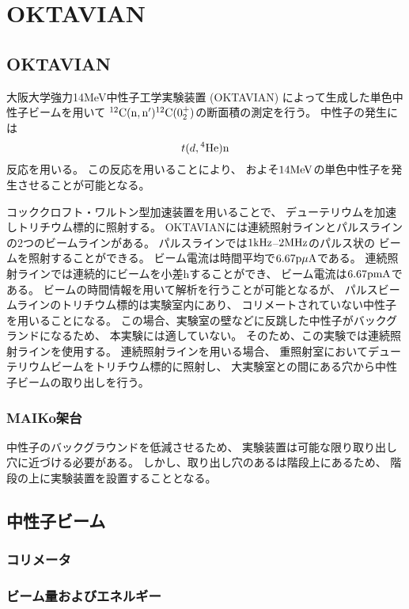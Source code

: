 \chapter{OKTAVIAN}
\section{OKTAVIAN}
大阪大学強力14MeV中性子工学実験装置 (OKTAVIAN) によって生成した単色中性子ビームを用いて
${}^{12}\rm{C}(n,n'){}^{12}\rm{C}(0_{2}^{+})$の断面積の測定を行う。
中性子の発生には
\begin{equation}
  t(d,{}^{4}\rm{He})n
\end{equation}
反応を用いる。
この反応を用いることにより、
およそ$14\rm{MeV}$の単色中性子を発生させることが可能となる。

コッククロフト・ワルトン型加速装置を用いることで、
デューテリウムを加速しトリチウム標的に照射する。
OKTAVIANには連続照射ラインとパルスラインの2つのビームラインがある。
パルスラインでは$1\rm{kHz}$--$2\rm{MHz}$のパルス状の
ビームを照射することができる。
ビーム電流は時間平均で$6.67\rm{p\mu A}$である。
連続照射ラインでは連続的にビームを小差hすることができ、
ビーム電流は$6.67\rm{pmA}$である。
ビームの時間情報を用いて解析を行うことが可能となるが、
パルスビームラインのトリチウム標的は実験室内にあり、
コリメートされていない中性子を用いることになる。
この場合、実験室の壁などに反跳した中性子がバックグランドになるため、
本実験には適していない。
そのため、この実験では連続照射ラインを使用する。
連続照射ラインを用いる場合、
重照射室においてデューテリウムビームをトリチウム標的に照射し、
大実験室との間にある穴から中性子ビームの取り出しを行う。

\subsection{MAIKo架台}
中性子のバックグラウンドを低減させるため、
実験装置は可能な限り取り出し穴に近づける必要がある。
しかし、取り出し穴のあるは階段上にあるため、
階段の上に実験装置を設置することとなる。

\section{中性子ビーム}
\subsection{コリメータ}
\subsection{ビーム量およびエネルギー}

